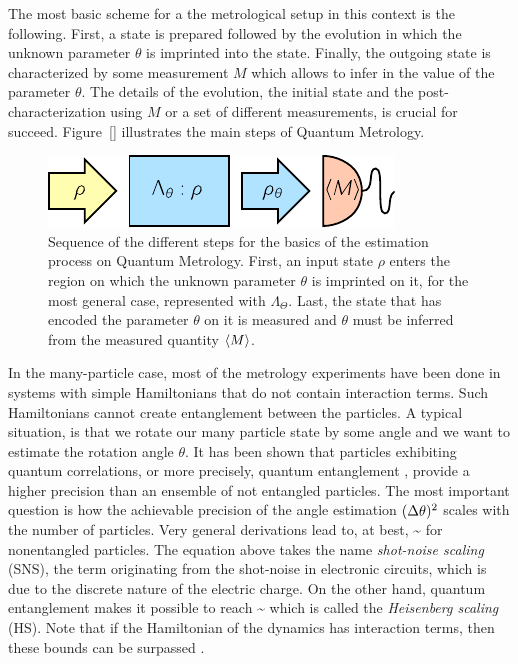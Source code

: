 The most basic scheme for a the metrological setup in this context is the following.
First, a state is prepared followed by the evolution in which the unknown parameter $\theta$ is imprinted into the state.
Finally, the outgoing state is characterized by some measurement $M$ which allows to infer in the value of the parameter $\theta$.
The details of the evolution, the initial state and the post-characterization using $M$ or a set of different measurements, is crucial for succeed.
Figure~\ref{} illustrates the main steps of Quantum Metrology.
\begin{figure}
  \centering
  \includegraphics[scale=1.4]{img/BG_preparation_encoding_estimation.pdf}
  \caption[Quantum Metrology estimation process]{Sequence of the different steps for the basics of the estimation process on Quantum Metrology. First, an input state $\rho$ enters the region on which the unknown parameter $\theta$ is imprinted on it, for the most general case, represented with $\Lambda_{\Theta}$. Last, the state that has encoded the parameter $\theta$ on it is measured and $\theta$ must be inferred from the measured quantity $\langle M \rangle$.}
  \label{fig:bg-preparation-encoding-estimation}
\end{figure}

In the many-particle case, most of the metrology experiments have been done in systems with simple Hamiltonians that do not contain interaction terms.
Such Hamiltonians cannot create entanglement between the particles.
A typical situation, is that we rotate our many particle state by some angle and we want to estimate the rotation angle $\theta$.
It has been shown that particles exhibiting quantum correlations, or more precisely, quantum entanglement \citep{Guehne2009, Luis2004}, provide a higher precision than an ensemble of not entangled particles.
The most important question is how the achievable precision of the angle estimation $(\Delta \theta )^2$ scales with the number of particles.
Very general derivations lead to, at best,
\be
  \label{eq:bg-shot-noise-scaling}
  \varian{\theta}\sim {}
\ee
for nonentangled particles.
The equation above takes the name \emph{shot-noise scaling} (SNS), the term originating from the shot-noise in electronic circuits, which is due to the discrete nature of the electric charge.
On the other hand, quantum entanglement makes it possible to reach
\be
  \label{eq:bg-heisenberg-scaling}
  \varian{\theta}\sim {}
\ee
which is called the \emph{Heisenberg scaling} (HS).
Note that if the Hamiltonian of the dynamics has interaction terms, then these bounds can be surpassed \citep{Luis2004, Napolitano2011, Boixo2007, Braun2011, Roy2008, Choi2008, Rey2007}.

